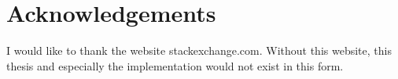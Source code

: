 \chapter*{Acknowledgements}

I would like to thank the website stackexchange.com.
Without this website, this thesis and especially the implementation would not exist in this form.